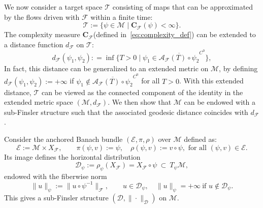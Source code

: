 \documentclass[12pt]{amsart}
\numberwithin{equation}{section}
\theoremstyle{remark}
\begin{document}


We now consider a target space $\mathcal T$ consisting of maps that can be approximated by the flows driven with $\mathcal F$ within a finite time:
\begin{equation} \mathcal T := \{\psi \in \mathcal M \mid \mathbf{C}_{\mathcal F}(\psi) < \infty\}.
\end{equation}
The complexity measure $\mathbf C_{\mathcal F}$(defined in~\eqref{eq:complexity_def}) can be extended to a distance function $d_{\mathcal F}$ on $\mathcal T$: \begin{equation}
  d_{\mathcal F}(\psi_1, \psi_2): = \inf\{T>0\mid \psi_1\in \overline{\mathcal A_{\mathcal F}(T)\circ \psi_2}^{C^0}\},
\end{equation}
In fact, this distance can be generalized to an extended metric on $\mathcal M$, by defining $d_{\mathcal F}(\psi_1, \psi_2):= +\infty$ if $\psi_1\notin \overline{\mathcal A_{\mathcal F}(T)\circ \psi_2}^{C^0}$ for all $T>0$.
With this extended distance, $\mathcal T$ can be viewed as the connected component of the identity in the extended metric space $(\mathcal M, d_{\mathcal F})$. We then show that $\mathcal M$ can be endowed with a sub-Finsler structure such that the associated geodesic distance coincides with $d_{\mathcal F}$.

Consider the anchored Banach bundle $(\mathcal E, \pi, \rho)$ over $\mathcal M$ defined as:
\begin{equation}
  \mathcal E:=\mathcal M\times  X_{\mathcal F},\qquad \pi(\psi,v):=\psi,
\quad
\rho(\psi,v):=v\circ \psi,
\text{ for all }(\psi,v)\in \mathcal E.
\end{equation}
Its image defines the horizontal distribution
\begin{equation}
\mathcal D_\psi:=\rho_\psi( X_{\mathcal F})= X_{\mathcal F}\circ\psi\ \subset\ T_\psi\mathcal M,
\end{equation}
endowed with the fiberwise norm
\begin{equation}
  \label{eq:sub-finsler-norm-def}
\|u\|_{\psi}:=\|u\circ\psi^{-1}\|_{\mathcal F},\qquad u\in\mathcal D_\psi,
\quad
\|u\|_{\psi}=+\infty\ \text{if }u\notin\mathcal D_\psi.
\end{equation}
This gives a
sub-Finsler structure $(\mathcal D,\|\cdot\|_{\mathcal D})$ on $\mathcal M$.
\end{document}
